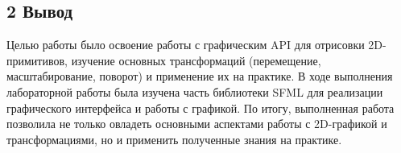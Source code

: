 \documentclass[12pt]{article}
\begin{document}
\subsection*{2 Вывод}

Целью работы было освоение работы с графическим API для отрисовки 2D-примитивов, изучение основных трансформаций (перемещение, масштабирование, поворот) и применение их на практике.
В ходе выполнения лабораторной работы была изучена часть библиотеки SFML для реализации графического интерфейса и работы с графикой. 
По итогу, выполненная работа позволила не только овладеть основными аспектами работы с 2D-графикой и трансформациями, но и применить полученные знания на практике.
\end{document}
